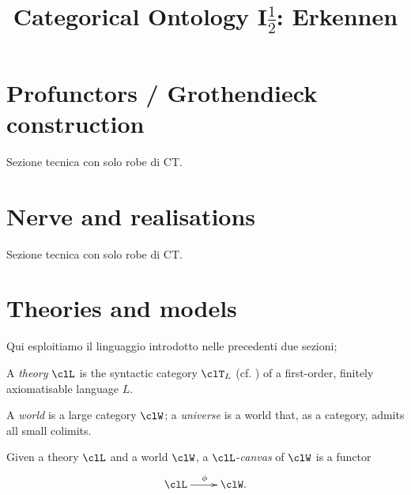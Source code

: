 \documentclass[a4paper]{../birkjour}
\title{Categorical Ontology I$\frac{1}{2}$: Erkennen}
\begin{document}
\maketitle
\tableofcontents


\section{Profunctors / Grothendieck construction}
\label{sec:org7dd09e1}
Sezione tecnica con solo robe di CT.
\section{Nerve and realisations}
\label{sec:org1a423df}
Sezione tecnica con solo robe di CT.
\section{Theories and models}
\label{sec:orge02f333}
Qui esploitiamo il linguaggio introdotto nelle precedenti due sezioni;
\begin{definition}[Theory]
  A \emph{theory} $\clL$ is the syntactic category $\clT_L$ (cf. \cite{}) of a first-order, finitely axiomatisable language $L$.
\end{definition}
\begin{definition}
  A \emph{world} is a large category $\clW$; a \emph{universe} is a world that, as a category, admits all small colimits.
\end{definition}
Given a theory $\clL$ and a world $\clW$, a $\clL$-\emph{canvas} of $\clW$ is a functor 
\[\xymatrix{\clL \ar[r]^\phi & \clW.}\]
\end{document}
